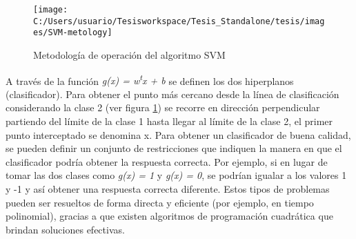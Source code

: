\begin{figure}
\begin{centering}
\texttt{[image: C:/Users/usuario/Tesisworkspace/Tesis\_Standalone/tesis/images/SVM-metology]}
\par\end{centering}

\caption{Metodología de operación del algoritmo SVM\label{fig:SVM-metology}}
\end{figure}


A través de la función \emph{g(x) = w\textsuperscript{t}x + b} se
definen los dos hiperplanos (clasificador). Para obtener el punto
más cercano desde la línea de clasificación considerando la clase
2 (ver figura \ref{fig:SVM-metology}) se recorre en dirección perpendicular
partiendo del límite de la clase 1 hasta llegar al límite de la clase
2, el primer punto interceptado se denomina x. Para obtener un clasificador
de buena calidad, se pueden definir un conjunto de restricciones que
indiquen la manera en que el clasificador podría obtener la respuesta
correcta. Por ejemplo, si en lugar de tomar las dos clases como \emph{g(x)
= 1} y \emph{g(x) = 0}, se podrían igualar a los valores 1 y -1 y
así obtener una respuesta correcta diferente. Estos tipos de problemas
pueden ser resueltos de forma directa y eficiente (por ejemplo, en
tiempo polinomial), gracias a que existen algoritmos de programación
cuadrática que brindan soluciones efectivas.

